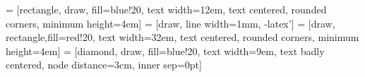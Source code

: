 \documentclass{article}
\begin{document}
\pagestyle{empty}
\renewcommand{\arraystretch}{0.75}




 = [rectangle, draw, fill=blue!20, 
    text width=12em, text centered, rounded corners, minimum height=4em]
 = [draw, line width=1mm, -latex']
 = [draw, rectangle,fill=red!20, 
       text width=32em, text centered, rounded corners, minimum height=4em]
 = [diamond, draw, fill=blue!20, 
    text width=9em, text badly centered, node distance=3cm, inner sep=0pt]
    
\end{document}
